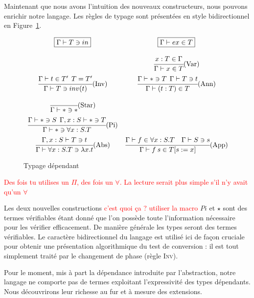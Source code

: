 \documentclass {article}
\theoremstyle{definition}
\theoremstyle{remark}
\newcommand{\todo}[1]{\textcolor{red}{#1}}
\begin{document}
Maintenant que nous avons l'intuition des nouveaux constructeurs, nous pouvons enrichir notre langage.
Les règles de typage sont présentées en style bidirectionnel en Figure~\ref{fig:typage dependant}.

\begin{figure}
  \[
  \begin{array}{cc}
  \boxed{\Gamma\vdash T \ni in}
  &
  \boxed{\Gamma\vdash ex \in T}
  \bigskip
  \\ 
  &
  \cfrac{x:T \in \Gamma}
        {\Gamma \vdash x \in T }\mbox{(Var)}
  \medskip
  \\
  \cfrac{\Gamma \vdash t \in T' \:\: T=T'}
        {\Gamma\vdash T \ni inv(t)}\mbox{(Inv)}
  &
  \cfrac{\Gamma\vdash * \ni T \:\:\Gamma\vdash T \ni t}
        {\Gamma\vdash (t:T) \in T}\mbox{(Ann)}
  \medskip
  \\
  \cfrac{}
        {\Gamma \vdash * \ni *}\mbox{(Star)} 
  \medskip
  \\
  \cfrac{\Gamma \vdash * \ni S\:\:\Gamma,x:S \vdash *\ni T}
        {\Gamma\vdash * \ni \forall x:S.T}\mbox{(Pi)}
  \medskip
  \\
  \cfrac{\Gamma,x:S\vdash T \ni t}
        {\Gamma \vdash \forall x:S.T \ni \lambda x. t}\mbox{(Abs)} 
  & 
  \cfrac{\Gamma \vdash f \in \forall x:S.T \quad \Gamma\vdash S \ni s }
        {\Gamma\vdash f\:s\in \subst{T}{s}{x}}\mbox{(App)} 
  \end{array}
  \]
  
  \caption{Typage dépendant}
  \label{fig:typage dependant} 
\end{figure}

\todo{Des fois tu utilises un $\Pi$, des fois un $\forall$. La lecture serait plus simple s'il n'y avait qu'un $\forall$}

Les deux nouvelles constructions \todo{c'est quoi ça ? utiliser la macro} $Pi$ et
$\star$ sont des termes vérifiables étant donné que l'on possède
toute l'information nécessaire pour les vérifier efficacement. De
manière générale les types seront des termes vérifiables.  Le caractère
bidirectionnel du langage est utilisé ici de façon cruciale
pour obtenir une présentation algorithmique du test de conversion : il
est tout simplement traité par le changement de phase (règle
\textsc{Inv}).

Pour le moment, mis à part la dépendance introduite par l'abstraction, notre langage ne comporte pas de termes exploitant 
l'expressivité des types dépendants. Nous découvrirons leur richesse au fur et à mesure des extensions.
\end{document}
